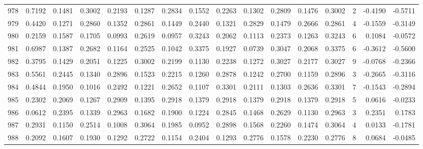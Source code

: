 \begin{tabular}{lrrrrrrrrrrrrrrr}
978 &      0.7192 &  0.1481 &  0.3002 &  0.2193 &  0.1287 &  0.2834 &  0.1552 &  0.2263 &  0.1302 &  0.2809 &   0.1476 &     0.3002 &      2 &                   -0.4190 &                    -0.5711 \\
979 &      0.4420 &  0.1271 &  0.2860 &  0.1352 &  0.2861 &  0.1449 &  0.2440 &  0.1321 &  0.2829 &  0.1479 &   0.2666 &     0.2861 &      4 &                   -0.1559 &                    -0.3149 \\
980 &      0.2159 &  0.1587 &  0.1705 &  0.0993 &  0.2619 &  0.0957 &  0.3243 &  0.2062 &  0.1113 &  0.2373 &   0.1263 &     0.3243 &      6 &                    0.1084 &                    -0.0572 \\
981 &      0.6987 &  0.1387 &  0.2682 &  0.1164 &  0.2525 &  0.1042 &  0.3375 &  0.1927 &  0.0739 &  0.3047 &   0.2068 &     0.3375 &      6 &                   -0.3612 &                    -0.5600 \\
982 &      0.3795 &  0.1429 &  0.2051 &  0.1225 &  0.3002 &  0.2199 &  0.1130 &  0.2238 &  0.1272 &  0.3027 &   0.2177 &     0.3027 &      9 &                   -0.0768 &                    -0.2366 \\
983 &      0.5561 &  0.2445 &  0.1340 &  0.2896 &  0.1523 &  0.2215 &  0.1260 &  0.2878 &  0.1242 &  0.2700 &   0.1159 &     0.2896 &      3 &                   -0.2665 &                    -0.3116 \\
984 &      0.4844 &  0.1950 &  0.1016 &  0.2492 &  0.1221 &  0.2652 &  0.1107 &  0.3301 &  0.2111 &  0.1303 &   0.2636 &     0.3301 &      7 &                   -0.1543 &                    -0.2894 \\
985 &      0.2302 &  0.2069 &  0.1267 &  0.2909 &  0.1395 &  0.2918 &  0.1379 &  0.2918 &  0.1379 &  0.2918 &   0.1379 &     0.2918 &      5 &                    0.0616 &                    -0.0233 \\
986 &      0.0612 &  0.2395 &  0.1339 &  0.2963 &  0.1682 &  0.1900 &  0.1224 &  0.2845 &  0.1468 &  0.2629 &   0.1130 &     0.2963 &      3 &                    0.2351 &                     0.1783 \\
987 &      0.2931 &  0.1150 &  0.2514 &  0.1008 &  0.3064 &  0.1985 &  0.0952 &  0.2898 &  0.1568 &  0.2260 &   0.1474 &     0.3064 &      4 &                    0.0133 &                    -0.1781 \\
988 &      0.2092 &  0.1607 &  0.1930 &  0.1292 &  0.2722 &  0.1154 &  0.2404 &  0.1293 &  0.2776 &  0.1578 &   0.2230 &     0.2776 &      8 &                    0.0684 &                    -0.0485 \\

\end{tabular}
